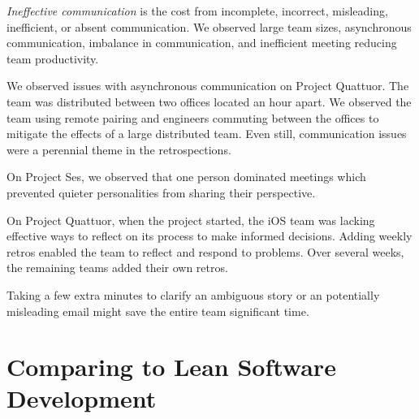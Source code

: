 \textit{Ineffective communication} is the cost from incomplete, incorrect, misleading, inefficient, or absent communication. We observed large team sizes, asynchronous communication, imbalance in communication, and inefficient meeting reducing team productivity.

We observed issues with asynchronous communication on Project Quattuor. The team was distributed between two offices located an hour apart. We observed the team using remote pairing and engineers commuting between the offices to mitigate the effects of a large distributed team. Even still, communication issues were a perennial theme in the retrospections.


On Project Ses, we observed that one person dominated meetings which prevented quieter personalities from sharing their perspective. 

On Project Quattuor, when the project started, the iOS team was lacking effective ways to reflect on its process to make informed decisions. Adding weekly retros enabled the team to reflect and respond to problems. Over several weeks, the remaining teams added their own retros. 

Taking a few extra minutes to clarify an ambiguous story or an potentially misleading email might save the entire team significant time.







\section{Comparing to Lean Software Development}
\label{LeanSoftwareDevelopmentComparison}

